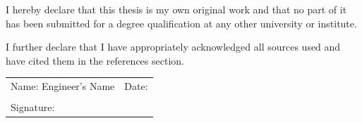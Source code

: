 I hereby declare that this thesis is my own original work and that no part of it has been submitted for a degree qualification at any other university or institute.

I further declare that I have appropriately acknowledged all sources used and have cited them in the references section.
\begin{table}[H]
\begin{tabular}{p{4in} l}
\\
Name: Engineer's Name   & Date:\\   %
\\
Signature:              &           %
\end{tabular}
\end{table}
